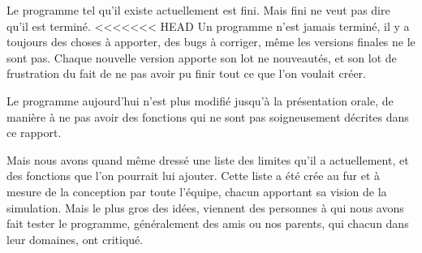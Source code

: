 Le programme tel qu'il existe actuellement est fini. Mais fini ne veut pas dire qu'il est terminé.
<<<<<<< HEAD
Un programme n'est jamais terminé, il y a toujours des choses à apporter, des bugs à corriger, même les versions finales ne le sont pas. Chaque nouvelle version apporte son lot ne nouveautés, et son lot de frustration du fait de ne pas avoir pu finir tout ce que l'on voulait créer.

Le programme aujourd'hui n'est plus modifié jusqu'à la présentation orale, de manière à ne pas avoir des fonctions qui ne sont pas soigneusement décrites dans ce rapport.

Mais nous avons quand même dressé une liste des limites qu'il a actuellement, et des fonctions que l'on pourrait lui ajouter. Cette liste a été crée au fur et à mesure de la conception par toute l'équipe, chacun apportant sa vision de la simulation. Mais le plus gros des idées, viennent des personnes à qui nous avons fait tester le programme, généralement des amis ou nos parents, qui chacun dans leur domaines, ont critiqué.

